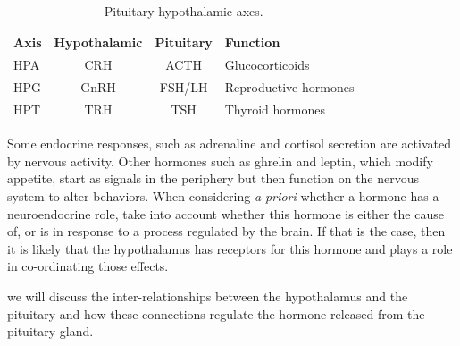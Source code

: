 \documentclass{tufte-handout}
\begin{document}
\begin{table}
  \centering
  \begin{tabular}{lccl}
    \toprule
    Axis & Hypothalamic & Pituitary & Function \\
    \midrule
    HPA & CRH & ACTH & Glucocorticoids \\
    HPG & GnRH & FSH/LH & Reproductive hormones \\
    HPT & TRH & TSH & Thyroid hormones \\
    \bottomrule
  \end{tabular}
  \caption{Pituitary-hypothalamic axes.}
  \label{tab:pituitary-axes}
\end{table}

  Some endocrine responses, such as adrenaline and cortisol secretion are activated by nervous activity.  Other hormones such as ghrelin and leptin, which modify appetite, start as signals in the periphery but then function on the nervous system to alter behaviors.  When considering \textit{a priori} whether a hormone has a neuroendocrine role, take into account whether this hormone is either the cause of, or is in response to a process regulated by the brain.  If that is the case, then it is likely that the hypothalamus has receptors for this hormone and plays a role in co-ordinating those effects.

 we will discuss the inter-relationships between the hypothalamus and the pituitary and how these connections regulate the hormone released from the pituitary gland.

\listoffigures
\listoftables



\end{document}
